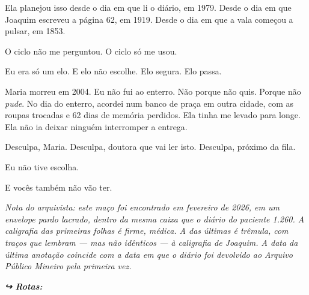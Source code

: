 \noindent Ela planejou isso desde o dia em que li o diário, em 1979. Desde o dia em que Joaquim escreveu a página 62, em 1919. Desde o dia em que a vala começou a pulsar, em 1853.

\noindent O ciclo não me perguntou. O ciclo só me usou.

\noindent Eu era só um elo. E elo não escolhe. Elo segura. Elo passa.

\noindent Maria morreu em 2004. Eu não fui ao enterro. Não porque não quis. Porque não \textit{pude}. No dia do enterro, acordei num banco de praça em outra cidade, com as roupas trocadas e 62 dias de memória perdidos. Ela tinha me levado para longe. Ela não ia deixar ninguém interromper a entrega.

\noindent Desculpa, Maria. Desculpa, doutora que vai ler isto. Desculpa, próximo da fila.

\noindent Eu não tive escolha.

\noindent E vocês também não vão ter.

\vspace{0.5em}
\noindent \textit{Nota do arquivista: este maço foi encontrado em fevereiro de 2026, em um envelope pardo lacrado, dentro da mesma caixa que o diário do paciente 1.260. A caligrafia das primeiras folhas é firme, médica. A das últimas é trêmula, com traços que lembram --- mas não idênticos --- à caligrafia de Joaquim. A data da última anotação coincide com a data em que o diário foi devolvido ao Arquivo Público Mineiro pela primeira vez.}

\noindent\textit{\textbf{↪ Rotas:}  \rotasep {} \rotasep {}}
